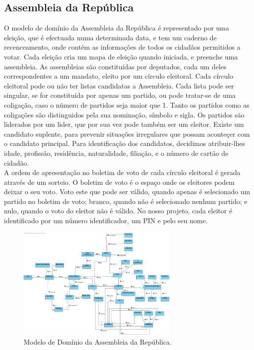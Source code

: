\documentclass[a4paper,12pt]{report}
\begin{document}
\subsection{Assembleia da República}

O modelo de domínio da Assembleia da República é representado por uma eleição, que é efectuada numa determinada data, e tem um caderno de recenceamento, onde contém as informações de todos os cidadãos permitidos a votar. Cada eleição cria um mapa de eleição quando iniciada, e preenche uma assembleia. As assembleias são constituídas por deputados, cada um deles correspondentes a um mandato, eleito por um círculo eleitoral. Cada círculo eleitoral pode ou não ter listas candidatas a Assembleia. Cada lista pode ser singular, se for constituída por apenas um partido, ou pode tratar-se de uma coligação, caso o número de partidos seja maior que 1. Tanto os partidos como as coligações são distinguidos pela sua nominação, símbolo e sigla. Os partidos são liderados por um lider, que por sua vez pode também ser um eleitor. Existe um candidato suplente, para prevenir situações irregulares que possam aconteçer com o candidato principal. Para identificação dos candidatos, decidimos atribuir-lhes idade, profissão, residência, naturalidade, filiação, e o número de cartão de cidadão. 
\\\indent A ordem de apresentação no boletim de voto de cada círculo eleitoral é gerada através de um sorteio. O boletim de voto é o espaço onde os eleitores podem deixar o seu voto. Voto este que pode ser válido, quando apenas é selecionado um partido no boletim de voto; branco, quando não é selecionado nenhum partido; e nulo, quando o voto do eleitor não é válido. No nosso projeto, cada eleitor é identificado por um número identificador, um PIN e pelo seu nome.

\begin{figure}[h]
\begin{center}
	\includegraphics[width=0.7\textwidth]{media/modelodominio/ar.png}
	 \caption{Modelo de Domínio da Assembleia da República.}
\end{center}
\end{figure}
\end{document}
